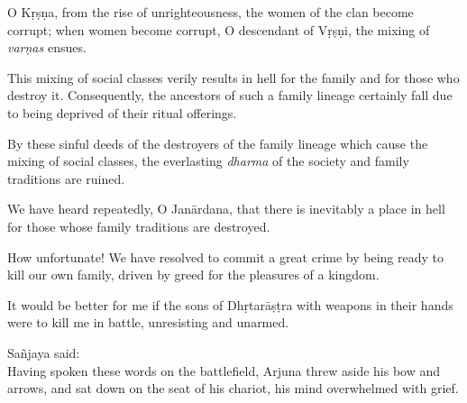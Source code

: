 {O Kṛṣṇa, from the rise of unrighteousness, the women of the clan become corrupt; when women become corrupt, O descendant of Vṛṣṇi, the mixing of \textit{varṇas} ensues.}

{This mixing of social classes verily results in hell for the family and for those who destroy it. Consequently, the ancestors of such a family lineage certainly fall due to being deprived of their ritual offerings.}

{By these sinful deeds of the destroyers of the family lineage which cause the mixing of social classes, the everlasting \textit{dharma} of the society and family traditions are ruined.}

{We have heard repeatedly, O Janārdana, that there is inevitably a place in hell for those whose family traditions are destroyed.}

{How unfortunate! We have resolved to commit a great crime by being ready to kill our own family, driven by greed for the pleasures of a kingdom.}

{It would be better for me if the sons of Dhṛtarāṣṭra with weapons in their hands were to kill me in battle, unresisting and unarmed.}


{\hspace*{1em}Sañjaya said: \\
Having spoken these words on the battlefield, Arjuna threw aside his bow and arrows, and sat down on the seat of his chariot, his mind overwhelmed with grief.}

